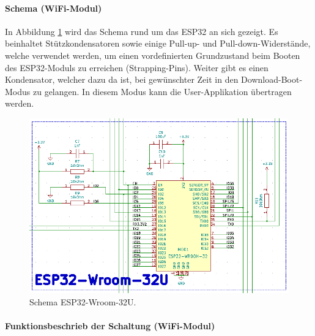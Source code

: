 \paragraph{Schema (WiFi-Modul)}\mbox{}

In Abbildung \ref{fig:Schema_ESP32} wird das Schema rund um das ESP32 an sich gezeigt. Es beinhaltet Stützkondensatoren sowie einige Pull-up- und Pull-down-Widerstände, welche verwendet werden, um einen vordefinierten Grundzustand beim Booten des ESP32-Moduls zu erreichen (Strapping-Pins). Weiter gibt es einen Kondensator, welcher dazu da ist, bei gewünschter Zeit in den Download-Boot-Modus zu gelangen. In diesem Modus kann die User-Applikation übertragen werden.

\begin{figure}[H]
	\centering
	\includegraphics[width=\textwidth]{graphics/Schema_ESP32}
	\caption{Schema ESP32-Wroom-32U.}
	\label{fig:Schema_ESP32}
\end{figure}

\paragraph{Funktionsbeschrieb der Schaltung (WiFi-Modul)}\mbox{}

